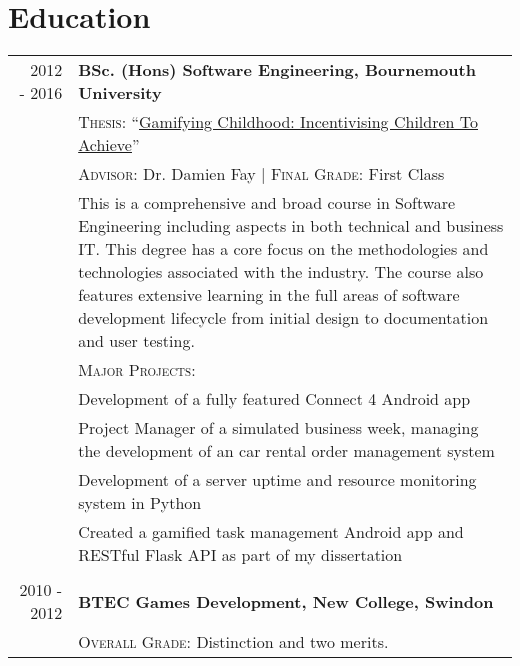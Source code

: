 \section{Education}
\begin{longtable}{r|p{11cm}}
\setlength{\LTpre}{0pt}
\setlength{\LTpost}{0pt}
	\ 2012 - 2016 & \textbf{BSc. (Hons) Software Engineering, Bournemouth University}\\ 
	\ & \textsc{Thesis}: ``\href{https://github.com/mikeporterdev/Dissertation/blob/master/digitalmain.pdf}{Gamifying Childhood: Incentivising Children To Achieve}'' \\
	\ & \textsc{Advisor}: Dr. Damien Fay | \normalsize \textsc{Final Grade}: First Class \\
	\ & \footnotesize This is a comprehensive and broad course in Software Engineering including aspects in both technical and business IT. This degree has a core focus on the methodologies and technologies associated with the industry. The course also features extensive learning in the full areas of software development lifecycle from initial design to documentation and user testing. \\
	\ & \textsc{Major Projects}: \\
	\ & \tabitem Development of a fully featured Connect 4 Android app \\
	\ & \tabitem Project Manager of a simulated business week, managing the development of an car rental order management system \\
	\ &	\tabitem Development of a server uptime and resource monitoring system in Python \\
	\ &	\tabitem Created a gamified task management Android app and RESTful Flask API as part of my dissertation \\

	\multicolumn{2}{c}{} \\


	2010 - 2012 & \textbf{BTEC Games Development, New College, Swindon}\\
	\ & \textsc{Overall Grade}: Distinction and two merits.
\end{longtable}

